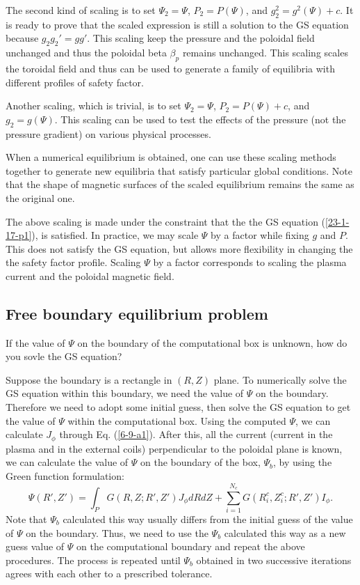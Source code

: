 \documentclass{llncs}
\begin{document}
The second kind of scaling is to set $\Psi_2 = \Psi$, $P_2 = P (\Psi)$, and
$g^2_2 = g^2 (\Psi) + c$. It is ready to prove that the scaled expression is
still a solution to the GS equation because $g_2 g_2' = g g'$. This scaling
keep the pressure and the poloidal field unchanged and thus the poloidal beta
$\beta_p$ remains unchanged. This scaling scales the toroidal field and thus
can be used to generate a family of equilibria with different profiles of
safety factor.

Another scaling, which is trivial, is to set $\Psi_2 = \Psi$, $P_2 = P (\Psi)
+ c$, and $g_2 = g (\Psi)$. This scaling can be used to test the effects of
the pressure (not the pressure gradient) on various physical processes.

When a numerical equilibrium is obtained, one can use these scaling methods
together to generate new equilibria that satisfy particular global conditions.
Note that the shape of magnetic surfaces of the scaled equilibrium remains the
same as the original one.

The above scaling is made under the constraint that the the GS equation
(\ref{23-1-17-p1}), is satisfied. In practice, we may scale $\Psi$ by a factor
while fixing $g$ and $P$. This does not satisfy the GS equation, but allows
more flexibility in changing the the safety factor profile. Scaling $\Psi$ by
a factor corresponds to scaling the plasma current and the poloidal magnetic
field.

\subsection{Free boundary equilibrium problem}

If the value of $\Psi$ on the boundary of the computational box is unknown,
how do you sovle the GS equation?

Suppose the boundary is a rectangle in $(R, Z)$ plane. To numerically solve
the GS equation within this boundary, we need the value of $\Psi$ on the
boundary. Therefore we need to adopt some initial guess, then solve the GS
equation to get the value of $\Psi$ within the computational box. Using the
computed $\Psi$, we can calculate $J_{\phi}$ through Eq. (\ref{6-9-a1}). After
this, all the current (current in the plasma and in the external coils)
perpendicular to the poloidal plane is known, we can calculate the value of
$\Psi$ on the boundary of the box, $\Psi_b$, by using the Green function
formulation:
\begin{equation}
  \label{10-31-1} \Psi (R', Z') = \int_P G (R, Z ; R', Z') J_{\phi} d R d Z +
  \sum_{i = 1}^{N_c} G (R^c_i, Z_i^c ; R', Z') I_{\phi} .
\end{equation}
Note that $\Psi_b$ calculated this way usually differs from the initial guess
of the value of $\Psi$ on the boundary. Thus, we need to use the $\Psi_b$
calculated this way as a new guess value of $\Psi$ on the computational
boundary and repeat the above procedures. The process is repeated until
$\Psi_b$ obtained in two successive iterations agrees with each other to a
prescribed tolerance.
\end{document}
